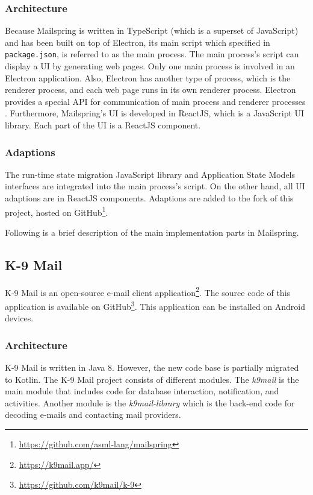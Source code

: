 \subsubsection{Architecture}
Because Mailspring is written in TypeScript (which is a superset of JavaScript) and has been built on top of Electron, its main script which specified in \lstinline[basicstyle=\ttfamily]{package.json}, is referred to as the main process. The main process's script can display a UI by generating web pages. Only one main process is involved in an Electron application. Also, Electron has another type of process, which is the renderer process, and each web page runs in its own renderer process. Electron provides a special API for communication of main process and renderer processes \cite{electron}. Furthermore, Mailspring's UI is developed in ReactJS, which is a JavaScript UI library. Each part of the UI is a ReactJS component.

\subsubsection{Adaptions}
The run-time state migration JavaScript library and Application State Models interfaces are integrated into the main process's script. On the other hand, all UI adaptions are in ReactJS components. Adaptions are added to the fork of this project, hosted on GitHub\footnote{\url{https://github.com/asml-lang/mailspring}}. 

Following is a brief description of the main implementation parts in Mailspring.



\subsection{K-9 Mail}
K-9 Mail is an open-source e-mail client application\footnote{\url{https://k9mail.app/}}. The source code of this application is available on GitHub\footnote{\url{https://github.com/k9mail/k-9}}. This application can be installed on Android devices.

\subsubsection{Architecture}
K-9 Mail is written in Java 8. However, the new code base is partially migrated to Kotlin. The K-9 Mail project consists of different modules. The \textit{k9mail} is the main module that includes code for database interaction, notification, and activities. Another module is the \textit{k9mail-library} which is the back-end code for decoding e-mails and contacting mail providers. 

